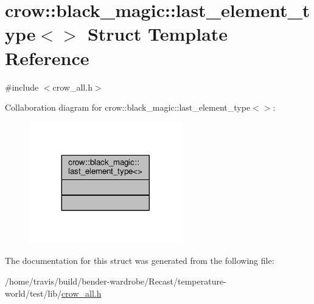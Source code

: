 \hypertarget{structcrow_1_1black__magic_1_1last__element__type_3_4}{\section{crow\-:\-:black\-\_\-magic\-:\-:last\-\_\-element\-\_\-type$<$$>$ Struct Template Reference}
\label{structcrow_1_1black__magic_1_1last__element__type_3_4}
}


{\ttfamily \#include $<$crow\-\_\-all.\-h$>$}



Collaboration diagram for crow\-:\-:black\-\_\-magic\-:\-:last\-\_\-element\-\_\-type$<$$>$\-:
\nopagebreak
\begin{figure}[H]
\begin{center}
\leavevmode
\includegraphics[width=188pt]{structcrow_1_1black__magic_1_1last__element__type_3_4__coll__graph}
\end{center}
\end{figure}


The documentation for this struct was generated from the following file\-:\begin{DoxyCompactItemize}
\item 
/home/travis/build/bender-\/wardrobe/\-Recast/temperature-\/world/test/lib/\hyperlink{crow__all_8h}{crow\-\_\-all.\-h}\end{DoxyCompactItemize}
